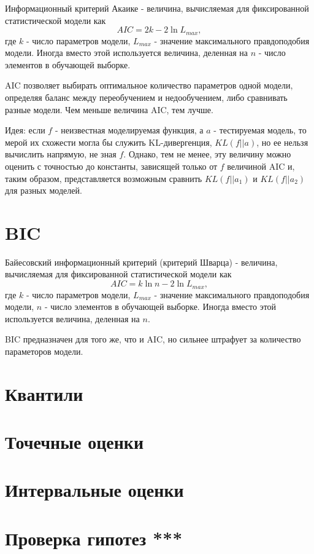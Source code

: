 Информационный критерий Акаике - величина, вычисляемая для фиксированной статистической модели как
$$
AIC = 2k - 2\ln L_{max},
$$
где $k$ - число параметров модели, $L_{max}$ - значение максимального правдоподобия модели. Иногда вместо этой используется величина, деленная на $n$ - число элементов в обучающей выборке.

AIC позволяет выбирать оптимальное количество параметров одной модели, определяя баланс между переобучением и недообучением, либо сравнивать разные модели. Чем меньше величина AIC, тем лучше.

Идея: если $f$ - неизвестная моделируемая функция, а $a$ - тестируемая модель, то мерой их схожести могла бы служить KL-дивергенция, $KL(f||a)$, но ее нельзя вычислить напрямую, не зная $f$. Однако, тем не менее, эту величину можно оценить с точностью до константы, зависящей только от $f$ величиной AIC и, таким образом, представляется возможным сравнить $KL(f||a_1)$ и $KL(f||a_2)$ для разных моделей.


\section{BIC}

Байесовский информационный критерий (критерий Шварца) - величина, вычисляемая для фиксированной статистической модели как
$$
AIC = k\ln n - 2\ln L_{max},
$$
где $k$ - число параметров модели, $L_{max}$ - значение максимального правдоподобия модели, $n$ - число элементов в обучающей выборке. Иногда вместо этой используется величина, деленная на $n$.

BIC предназначен для того же, что и AIC, но сильнее штрафует за количество параметоров модели.


\section{Квантили}


\section{Точечные оценки}


\section{Интервальные оценки}


\section{Проверка гипотез ***}


